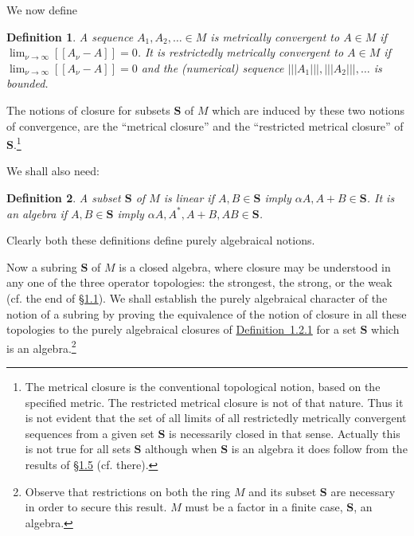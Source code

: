 \documentclass[b5paper,twoside]{article}
\newcommand{\secref}[2]{\hyperref[#1]{\mbox{\S#2}}}
\newcommand{\defref}[2]{\hyperref[#1]{\mbox{Definition~#2}}}
\theoremstyle{mvnplain}
\newtheorem{definition}{Definition}[section]
\newcommand{\M}{\mathbf M}
\newcommand{\Metric}[1]{\left[\!\left[#1\right]\!\right]}
\newcommand{\OpNorm}[1]{\left\lvert\left\lvert\left\lvert#1\right\rvert\right\rvert\right\rvert}
\def\M{M}%
\def\Metric#1{[[#1]]}%
\begin{document}
We now define
\begin{definition}\label{def:1.2.1}
A sequence $A_1,A_2,\ldots\in\M$ is metrically convergent to $A\in\M$ if
$\lim_{\nu\to\infty}\Metric{A_\nu-A}=0$.  It is restrictedly metrically
convergent to $A\in\M$ if $\lim_{\nu\to\infty}\Metric{A_\nu-A}=0$ and the
(numerical) sequence $\OpNorm{A_1},\OpNorm{A_2},\ldots$ is bounded.
\end{definition}

The notions of closure for subsets $\mathbf S$ of $\M$ which are induced by
these two notions of convergence, are the ``metrical closure'' and the
``restricted metrical closure'' of $\mathbf S$.\footnote{The metrical closure is
the conventional topological notion, based on the specified metric.  The
restricted metrical closure is not of that nature.  Thus it is not evident that
the set of all limits of all restrictedly metrically convergent sequences from a
given set $\mathbf S$ is necessarily closed in that sense.  Actually this is not
true for all sets $\mathbf S$ although when $\mathbf S$ is an algebra it does
follow from the results of \secref{sec:1.5}{1.5} (cf. there).}

We shall also need:
\begin{definition}\label{def:1.2.2}
A subset $\mathbf S$ of $\M$ is linear if $A,B\in\mathbf S$ imply
$\alpha A,A+B\in\mathbf S$.  It is an algebra if $A,B\in\mathbf S$ imply
$\alpha A,A^*,A+B,AB\in\mathbf S$.
\end{definition}
Clearly both these definitions define purely algebraical notions.

Now a subring $\mathbf S$ of $\M$ is a closed algebra, where closure may be
understood in any one of the three operator topologies: the strongest, the
strong, or the weak (cf. the end of \secref{sec:1.1}{1.1}).  We shall establish
the purely algebraical character of the notion of a subring by proving the
equivalence of the notion of closure in all these topologies to the purely
algebraical closures of \defref{def:1.2.1}{1.2.1} for a set $\mathbf S$ which is
an algebra.\footnote{Observe that restrictions on both the ring $\M$ and its
subset $\mathbf S$ are necessary in order to secure this result.  $\M$ must be a
factor in a finite case, $\mathbf S$, an algebra.}
\end{document}
